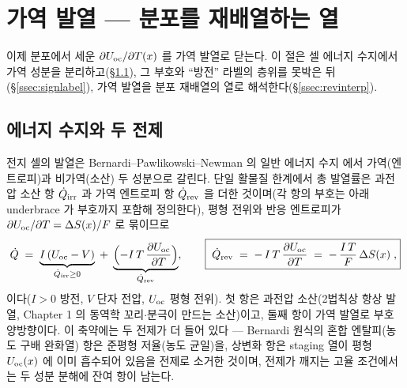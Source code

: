 \section{가역 발열 --- 분포를 재배열하는 열}\label{sec:revheat}

이제 분포에서 세운 $\partial U_{\mathrm{oc}}/\partial T(x)$ 를 가역 발열로 닫는다. 이 절은 셀 에너지 수지에서 가역 성분을
분리하고(\S\ref{ssec:balance}), 그 부호와 ``방전'' 라벨의 층위를 못박은 뒤(\S\ref{ssec:signlabel}), 가역 발열을
분포 재배열의 열로 해석한다(\S\ref{ssec:revinterp}).

\subsection{에너지 수지와 두 전제}\label{ssec:balance}
전지 셀의 발열은 Bernardi--Pawlikowski--Newman 의 일반 에너지 수지 \cite{bernardi1985} 에서 가역(엔트로피)과
비가역(소산) 두 성분으로 갈린다. 단일 활물질 한계에서 총 발열률은 과전압 소산 항 $\dot Q_{\mathrm{irr}}$ 과 가역
엔트로피 항 $\dot Q_{\mathrm{rev}}$ 을 더한 것이며(각 항의 부호는 아래 underbrace 가 부호까지 포함해 정의한다),
평형 전위와 반응 엔트로피가 $\partial U_{\mathrm{oc}}/\partial T=\Delta S(x)/F$ 로 묶이므로
\begin{equation}
\dot Q \;=\; \underbrace{I\,(U_{\mathrm{oc}}-V)}_{\dot Q_{\mathrm{irr}}\ge0}\;+\;\underbrace{\Bigl(-I\,T\,\frac{\partial U_{\mathrm{oc}}}{\partial T}\Bigr)}_{\dot Q_{\mathrm{rev}}},
\qquad
\boxed{\;\dot Q_{\mathrm{rev}} \;=\; -\,I\,T\,\frac{\partial U_{\mathrm{oc}}}{\partial T}\;=\;-\,\frac{I\,T}{F}\,\Delta S(x)\;,}
\label{eq:qrev}
\end{equation}
이다($I>0$ 방전, $V$ 단자 전압, $U_{\mathrm{oc}}$ 평형 전위). 첫 항은 과전압 소산(2법칙상 항상 발열, Chapter 1 의
동역학 꼬리$\cdot$분극이 만드는 소산)이고, 둘째 항이 가역 발열로 부호 양방향이다. 이 축약에는 두 전제가 더
들어 있다 --- Bernardi 원식의 혼합 엔탈피(농도 구배 완화열) 항은 준평형 저율(농도 균일)을, 상변화 항은
staging 열이 평형 $U_{\mathrm{oc}}(x)$ 에 이미 흡수되어 있음을 전제로 소거한 것이며, 전제가 깨지는 고율 조건에서는 두
성분 분해에 잔여 항이 남는다.

